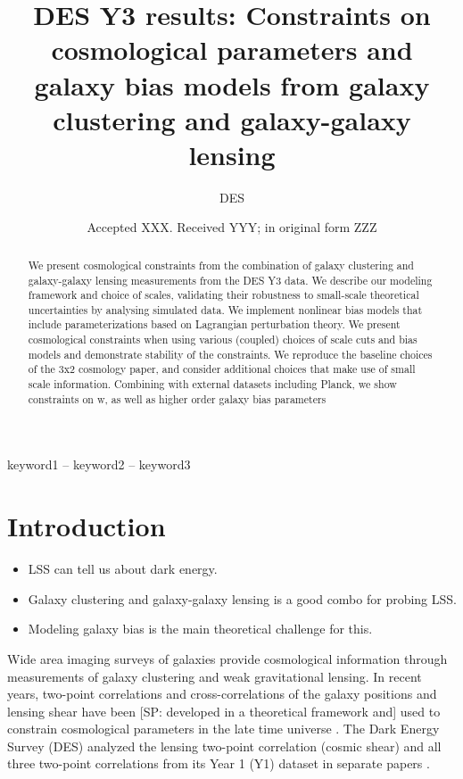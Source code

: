 \documentclass[fleqn,usenatbib]{mnras}
\title[Short title, max. 45 characters]{DES Y3 results: Constraints on cosmological parameters and galaxy bias models from galaxy clustering and galaxy-galaxy lensing}
\author[DES et al.]{
DES
}
\date{Accepted XXX. Received YYY; in original form ZZZ}
\newcommand{\SP}[1]{{\color{red}[SP: #1]}}
\begin{document}
\label{firstpage}
\pagerange{\pageref{firstpage}--\pageref{lastpage}}
\maketitle

\begin{abstract}
We present cosmological constraints from the combination of galaxy clustering and galaxy-galaxy lensing measurements from the DES Y3 data. We describe our modeling framework and choice of scales, validating their robustness to small-scale theoretical uncertainties by analysing simulated data. We implement nonlinear bias models that include parameterizations based on Lagrangian perturbation theory. We present cosmological constraints when using various (coupled) choices of scale cuts and bias models and demonstrate stability of the constraints. We reproduce the baseline choices of the 3x2 cosmology paper, and consider additional choices that make use of small scale information.  Combining with external datasets including Planck, we show constraints on w, as well as higher order galaxy bias parameters
\end{abstract}

\begin{keywords}
keyword1 -- keyword2 -- keyword3
\end{keywords}



\section{Introduction}
\label{sec:intro}
\begin{itemize}
    \item LSS can tell us about dark energy.
    \item Galaxy clustering and galaxy-galaxy lensing is a good combo for probing LSS.
    \item Modeling galaxy bias is the main theoretical challenge for this.
\end{itemize}

Wide area imaging surveys of galaxies provide cosmological information through measurements of galaxy clustering and weak gravitational lensing. In recent years, two-point correlations and cross-correlations of the galaxy positions and lensing shear have been \SP{developed in a theoretical framework\citep{Cacciato_2009,Baldauf_2010,Cacciato_2012,van_den_Bosch_2013} and} used to constrain cosmological parameters in the late time universe \citep{Cacciato_2013,Mandelbaum_2013,Kwan_2016,More_2015,Dvornik_2018,Coupon_2015}. The Dark Energy Survey (DES) analyzed the lensing two-point correlation (cosmic shear) and all three two-point correlations from its Year 1 (Y1) dataset in separate papers \citep{Abbott_2018,Troxel_2018}. 
\end{document}
